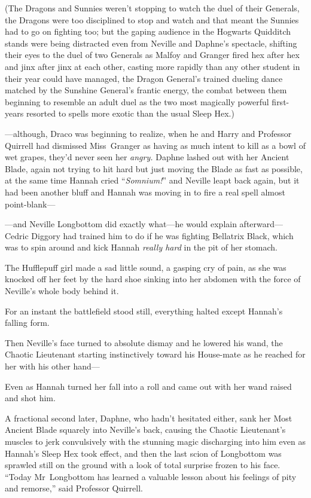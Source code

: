 (The Dragons and Sunnies weren’t stopping to watch the duel of their Generals,
the Dragons were too disciplined to stop and watch and that meant the Sunnies
had to go on fighting too; but the gaping audience in the Hogwarts Quidditch
stands were being distracted even from Neville and Daphne’s spectacle, shifting
their eyes to the duel of two Generals as Malfoy and Granger fired hex after
hex and jinx after jinx at each other, casting more rapidly than any other
student in their year could have managed, the Dragon General’s trained dueling
dance matched by the Sunshine General’s frantic energy, the combat between them
beginning to resemble an adult duel as the two most magically powerful
first-years resorted to spells more exotic than the usual Sleep Hex.)

—although, Draco was beginning to realize, when he and Harry and Professor
Quirrell had dismissed Miss~Granger as having as much intent to kill as a bowl
of wet grapes, they’d never seen her \emph{angry.}
\later
Daphne lashed out with her Ancient Blade, again not trying to hit hard but just
moving the Blade as fast as possible, at the same time Hannah cried
“\emph{Somnium!}” and Neville leapt back again, but it had been another bluff
and Hannah was moving in to fire a real spell almost point-blank—

—and Neville Longbottom did exactly what—he would explain
afterward—Cedric Diggory had trained him to do if he was fighting Bellatrix
Black, which was to spin around and kick Hannah \emph{really hard} in the pit
of her stomach.

The Hufflepuff girl made a sad little sound, a gasping cry of pain, as she was
knocked off her feet by the hard shoe sinking into her abdomen with the force
of Neville’s whole body behind it.

For an instant the battlefield stood still, everything halted except Hannah’s
falling form.

Then Neville’s face turned to absolute dismay and he lowered his wand, the
Chaotic Lieutenant starting instinctively toward his House-mate as he reached
for her with his other hand—

Even as Hannah turned her fall into a roll and came out with her wand raised
and shot him.

A fractional second later, Daphne, who hadn’t hesitated either, sank her Most
Ancient Blade squarely into Neville’s back, causing the Chaotic Lieutenant’s
muscles to jerk convulsively with the stunning magic discharging into him even
as Hannah’s Sleep Hex took effect, and then the last scion of Longbottom was
sprawled still on the ground with a look of total surprise frozen to his face.
\later
“Today Mr~Longbottom has learned a valuable lesson about his feelings of pity
and remorse,” said Professor Quirrell.

